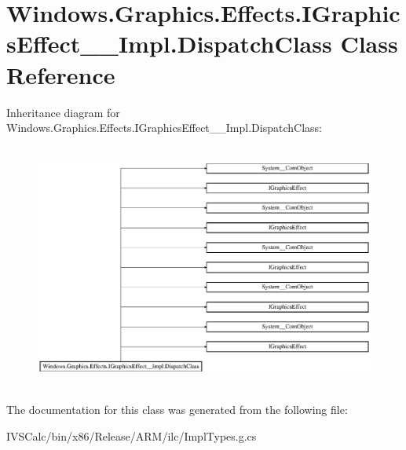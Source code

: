 \hypertarget{class_windows_1_1_graphics_1_1_effects_1_1_i_graphics_effect_____impl_1_1_dispatch_class}{}\section{Windows.\+Graphics.\+Effects.\+I\+Graphics\+Effect\+\_\+\+\_\+\+Impl.\+Dispatch\+Class Class Reference}
\label{class_windows_1_1_graphics_1_1_effects_1_1_i_graphics_effect_____impl_1_1_dispatch_class}
Inheritance diagram for Windows.\+Graphics.\+Effects.\+I\+Graphics\+Effect\+\_\+\+\_\+\+Impl.\+Dispatch\+Class\+:\begin{figure}[H]
\begin{center}
\leavevmode
\includegraphics[height=8.126648cm]{class_windows_1_1_graphics_1_1_effects_1_1_i_graphics_effect_____impl_1_1_dispatch_class}
\end{center}
\end{figure}


The documentation for this class was generated from the following file\+:\begin{DoxyCompactItemize}
\item 
I\+V\+S\+Calc/bin/x86/\+Release/\+A\+R\+M/ilc/Impl\+Types.\+g.\+cs\end{DoxyCompactItemize}
